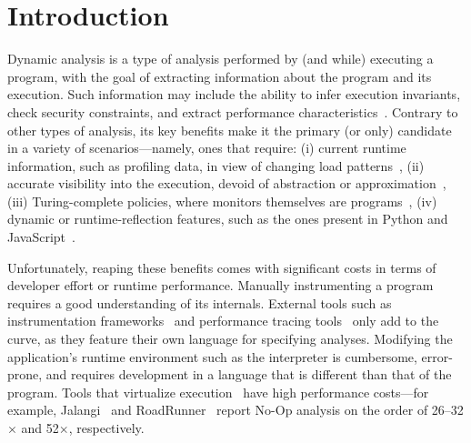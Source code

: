 \documentclass[letterpaper,twocolumn,10pt]{article}
\begin{document}
\section{Introduction}
\label{intro}

Dynamic analysis is a type of analysis performed by (and while) executing a program, with the goal of extracting information about the program and its execution.
Such information may include the ability to infer execution invariants, check security constraints, and extract performance characteristics~\cite{analysis:10}.
Contrary to other types of analysis, its key benefits make it the primary (or only) candidate in a variety of scenarios---namely, ones that require:
  (i) current runtime information, such as profiling data, in view of changing load patterns~\cite{staticdynamic},
  (ii) accurate visibility into the execution, devoid of abstraction or approximation~\cite{staticdynamic},
  (iii) Turing-complete policies, where monitors themselves are programs~\cite{contracts1, contracts2, contracts3},
  (iv) dynamic or runtime-reflection features, such as the ones present in Python and JavaScript~\cite{jsanalysis1, jsanalysis2}.


Unfortunately, reaping these benefits comes with significant costs in terms of developer effort or runtime performance.
Manually instrumenting a program requires a good understanding of its internals. %
External tools such as instrumentation frameworks~\cite{pin, valgrind} and performance tracing tools~\cite{perf, dtrace} only add to the curve, as they feature their own language for specifying analyses. %
Modifying the application's runtime environment such as the interpreter is cumbersome, error-prone, and requires development in a language that is different than that of the program.
Tools that virtualize execution~\cite{pin, valgrind, jalangi, roadrunner} have high performance costs---for example, Jalangi~\cite{jalangi} and RoadRunner~\cite{roadrunner} report No-Op analysis on the order of 26--32$\times$ and 52$\times$, respectively.
\end{document}
